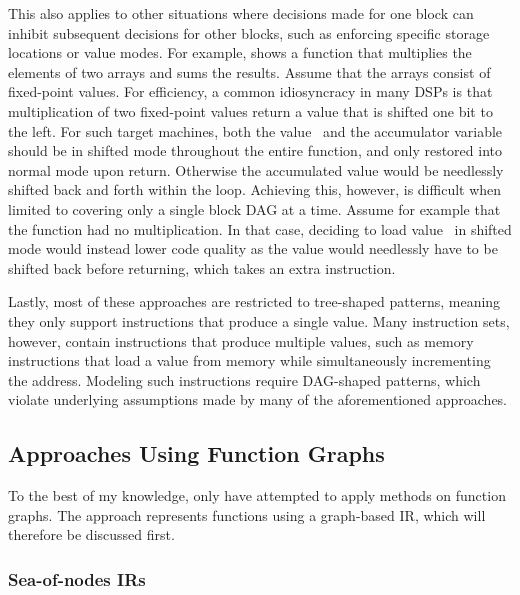 This also applies to other situations where decisions made for one \gls{block}
can inhibit subsequent decisions for other \glspl{block}, such as enforcing
specific storage locations or value modes.
%
For example,  shows a \gls{function} that
multiplies the elements of two arrays and sums the results.
%
Assume that the arrays consist of fixed-point values.
%
For efficiency, a common idiosyncracy in many \glspl{DSP} is that multiplication
of two fixed-point values return a value that is shifted one bit to the left.
%
For such \glspl{target machine}, both the value~ and the accumulator
\gls{variable}~ should be in shifted mode throughout the entire
\gls{function}, and only restored into normal mode upon return.
%
Otherwise the accumulated value would be needlessly shifted back and forth
within the loop.
%
Achieving this, however, is difficult when limited to covering only a single
\gls{block DAG} at a time.
%
Assume for example that the function had no multiplication.
%
In that case, deciding to load value~ in shifted mode would instead
lower code quality as the value would needlessly have to be shifted back before
returning, which takes an extra \gls{instruction}.

Lastly, most of these approaches are restricted to tree-shaped \glspl{pattern},
meaning they only support \glspl{instruction} that produce a single value.
%
Many \glspl{instruction set}, however, contain \glspl{instruction} that produce
multiple values, such as memory \glspl{instruction} that load a value from
memory while simultaneously incrementing the address.
%
Modeling such \glspl{instruction} require \gls{DAG}-shaped \glspl{pattern},
which violate underlying assumptions made by many of the aforementioned
approaches.



\subsection{Approaches Using Function Graphs}

To the best of my knowledge, only \textcite{PalecznyEtAl:2001} have attempted to
apply  methods on \glspl{function graph}.
%
The approach represents \glspl{function} using a graph-based \gls{IR}, which
will therefore be discussed first.



\subsubsection{Sea-of-nodes IRs}

